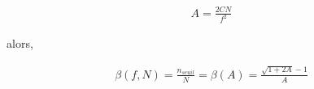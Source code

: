 \begin{center}
\begin{eqnarray}
A= \frac{2CN}{f^2}
\end{eqnarray}
\end{center}
alors,
\begin{center}
\begin{eqnarray}
\beta(f,N)= \frac{n_{seuil}}{N}= \beta(A)= \frac{\sqrt{1+2A}-1}{A}
\end{eqnarray}
\end{center}
%
%
%
